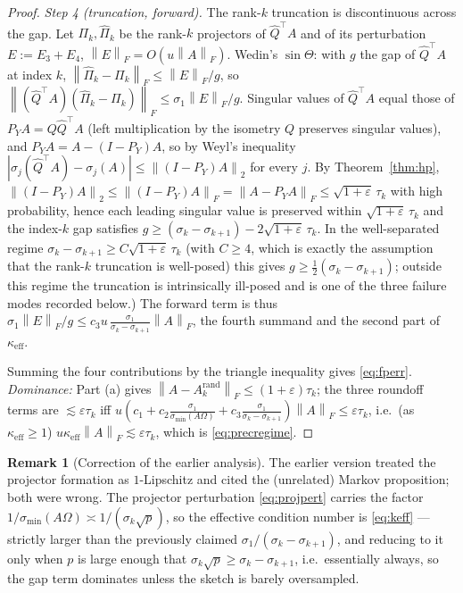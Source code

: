 \documentclass{amsart}
\theoremstyle{definition}
\newtheorem{remark}{Remark}
\newcommand{\Frob}[1]{\left\lVert #1\right\rVert_F}
\newcommand{\Op}[1]{\left\lVert #1\right\rVert_2}
\begin{document}
\begin{proof}
\emph{Step 4 (truncation, forward).} The rank-$k$ truncation is discontinuous
across the gap. Let $\Pi_k,\widehat\Pi_k$ be the rank-$k$ projectors of
$\widehat Q^\top A$ and of its perturbation $E:=E_3+E_4$, $\Frob E=O(u\Frob A)$.
Wedin's $\sin\Theta$: with $g$ the gap of $\widehat Q^\top A$ at index $k$,
$\Frob{\widehat\Pi_k-\Pi_k}\le\Frob E/g$, so
$\Frob{(\widehat Q^\top A)(\widehat\Pi_k-\Pi_k)}\le\sigma_1\Frob E/g$. Singular
values of $\widehat Q^\top A$ equal those of $P_YA=Q\widehat Q^\top A$ (left
multiplication by the isometry $Q$ preserves singular values), and
$P_YA=A-(I-P_Y)A$, so by Weyl's inequality
$|\sigma_j(\widehat Q^\top A)-\sigma_j(A)|\le\Op{(I-P_Y)A}$ for every $j$.
By Theorem~\ref{thm:hp},
$\Op{(I-P_Y)A}\le\Frob{(I-P_Y)A}=\Frob{A-P_YA}\le\sqrt{1+\varepsilon}\,\tau_k$
with high probability, hence each leading singular value is preserved within
$\sqrt{1+\varepsilon}\,\tau_k$ and the index-$k$ gap satisfies
$g\ge(\sigma_k-\sigma_{k+1})-2\sqrt{1+\varepsilon}\,\tau_k$. In the
well-separated regime $\sigma_k-\sigma_{k+1}\ge C\sqrt{1+\varepsilon}\,\tau_k$
(with $C\ge4$, which is exactly the assumption that the rank-$k$ truncation is
well-posed) this gives $g\ge\tfrac12(\sigma_k-\sigma_{k+1})$; outside this
regime the truncation is intrinsically ill-posed and is one of the three failure
modes recorded below.) The forward term is thus
$\sigma_1\Frob E/g\le c_3 u\,\frac{\sigma_1}{\sigma_k-\sigma_{k+1}}\Frob A$, the
fourth summand and the second part of $\kappa_{\mathrm{eff}}$.

Summing the four contributions by the triangle inequality gives \eqref{eq:fperr}.
\emph{Dominance:} Part (a) gives $\Frob{A-A_k^{\mathrm{rand}}}\le(1+\varepsilon)\tau_k$;
the three roundoff terms are $\lesssim\varepsilon\tau_k$ iff
$u(c_1+c_2\frac{\sigma_1}{\sigma_{\min}(A\Omega)}+c_3\frac{\sigma_1}{\sigma_k-\sigma_{k+1}})\Frob A
\le\varepsilon\tau_k$, i.e.\ (as $\kappa_{\mathrm{eff}}\ge1$)
$u\kappa_{\mathrm{eff}}\Frob A\lesssim\varepsilon\tau_k$, which is
\eqref{eq:precregime}.
\end{proof}

\begin{remark}[Correction of the earlier analysis]\label{rem:c7c8}
The earlier version treated the projector formation as $1$-Lipschitz and cited
the (unrelated) Markov proposition; both were wrong. The projector perturbation
\eqref{eq:projpert} carries the factor $1/\sigma_{\min}(A\Omega)\asymp
1/(\sigma_k\sqrt p)$, so the effective condition number is \eqref{eq:keff} ---
strictly larger than the previously claimed
$\sigma_1/(\sigma_k-\sigma_{k+1})$, and reducing to it only when $p$ is large
enough that $\sigma_k\sqrt p\ge\sigma_k-\sigma_{k+1}$, i.e.\ essentially always,
so the gap term dominates unless the sketch is barely oversampled.
\end{remark}
\end{document}
